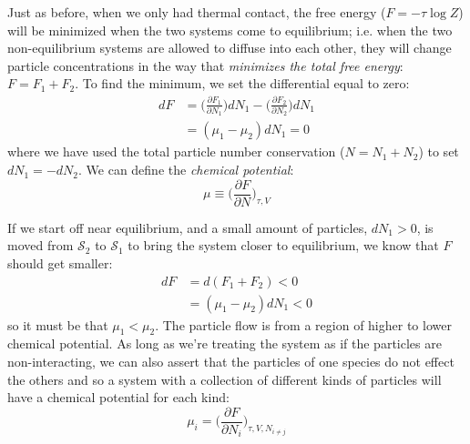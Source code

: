 Just as before, when we only had thermal contact, the 
free energy ($F = -\tau \log{Z}$) will be minimized when the two
systems come to equilibrium; i.e. when the two non-equilibrium
systems are allowed to diffuse into each other, they will change
particle concentrations in the way that \textit{minimizes the total
free energy}: $F = F_1 + F_2$. To find the minimum, we set the differential equal to zero:
\begin{align}
dF &= \bigg(\frac{\partial F_1}{\partial N_1}\bigg) dN_1
	- \bigg(\frac{\partial F_2}{\partial N_2}\bigg) dN_1 \\
   &= (\mu_1 - \mu_2) dN_1 = 0
\end{align}
where we have used the total particle number conservation ($N = N_1 + N_2$)
to set $dN_1 = -dN_2$. We can define the \textit{chemical potential}:
\begin{equation}
\boxed{\mu \equiv \bigg(\frac{\partial F}{\partial N}\bigg)_{\tau,V}}
\label{eq:ChemPot}
\end{equation}

If we start off near equilibrium, and a small amount of particles, 
$dN_1 > 0$, is moved from $\mathcal{S}_2$ to $\mathcal{S}_1$ to
bring the system closer to equilibrium, we know that $F$ should get smaller:
\begin{align}
dF &= d(F_1 + F_2) < 0 \\
   &= (\mu_1 - \mu_2) dN_1 < 0
\end{align}
so it must be that $\mu_1 < \mu_2$. The particle flow is from a region of
higher to lower chemical potential. As long as we're treating the system as if the particles are non-interacting, we can also assert that the particles of one species do not effect the others and so a system with a collection of different kinds of particles will have a chemical potential for each kind:
\begin{equation}
\mu_i = \bigg(\frac{\partial F}{\partial N_i}\bigg)_{\tau,V,N_{i \neq j}}
\end{equation}


